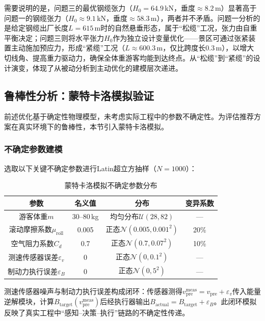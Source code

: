 \documentclass[12pt,a4paper]{ctexart}
\begin{document}
需要说明的是，问题三的最优钢缆张力（$H_0=64.9$\,kN，垂度$\approx 8.2$\,m）显著高于问题一的钢缆张力（$H_0\approx 9.1$\,kN，垂度$\approx 58.3$\,m），两者并不矛盾。问题一分析的是给定钢缆出厂长度$L=615$\,m时的自然悬垂形态，属于``松缆''工况，张力由自重平衡决定；问题三则将水平张力$H_0$作为独立设计变量优化——景区可通过张紧装置主动施加预应力，形成``紧缆''工况（$L\approx 600.3$\,m，仅比跨度长0.3\,m），以增大切线角、提高重力驱动力，确保全体重游客均能到达终点。从``松缆''到``紧缆''的设计演变，体现了从被动分析到主动优化的建模层次递进。

\subsection{鲁棒性分析：蒙特卡洛模拟验证}
\label{sec:robustness}

前述优化基于确定性物理模型，未考虑实际工程中的参数不确定性。为评估推荐方案在真实环境下的鲁棒性，本节引入蒙特卡洛模拟。

\subsubsection{不确定参数建模}

选取以下关键不确定参数进行Latin超立方抽样\cite{mckay1979}（$N=1000$）：

\begin{table}[H]
  \centering
  \caption{蒙特卡洛模拟不确定参数分布}
  \label{tab:mc_params}
  \renewcommand{\arraystretch}{1.2}
  \begin{tabular}{c|c|c|c}
    \toprule
    \textbf{参数} & \textbf{名义值} & \textbf{分布} & \textbf{变异系数} \\
    \midrule
    游客体重$m$ & 30--80\,kg & 均匀分布$\mathcal{U}(28, 82)$ & — \\
    滚动摩擦系数$\mu_{\text{roll}}$ & 0.005 & 正态$\mathcal{N}(0.005, 0.001^2)$ & 20\% \\
    空气阻力系数$C_d$ & 0.7 & 正态$\mathcal{N}(0.7, 0.07^2)$ & 10\% \\
    测速传感器误差$\varepsilon_v$ & 0 & 正态$\mathcal{N}(0, 0.1^2)$ & — \\
    制动力执行误差$\varepsilon_B$ & 0 & 正态$\mathcal{N}(0, 5^2)$ & — \\
    \bottomrule
  \end{tabular}
\end{table}

测速传感器噪声与制动力执行误差构成闭环：传感器测得$v_{\text{pre}}^{\text{meas}} = v_{\text{pre}} + \varepsilon_v$传入能量逆解模块，计算$B_{\text{target}}(v_{\text{pre}}^{\text{meas}})$后经执行器输出$B_{\text{actual}} = B_{\text{target}} + \varepsilon_B$。此闭环模拟反映了真实工程中``感知--决策--执行''链路的不确定性传递。
\end{document}
